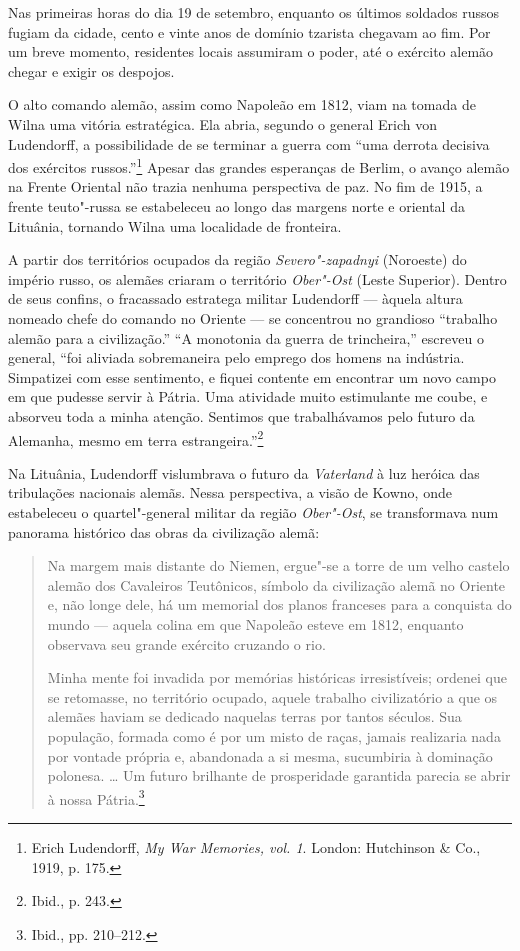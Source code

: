 Nas primeiras horas do dia 19 de setembro, enquanto os últimos soldados
russos fugiam da cidade, cento e vinte anos de domínio tzarista chegavam
ao fim. Por um breve momento, residentes locais assumiram o poder, até o
exército alemão chegar e exigir os despojos.

O alto comando alemão, assim como Napoleão em 1812, viam na tomada de
Wilna uma vitória estratégica. Ela abria, segundo o general Erich von
Ludendorff, a possibilidade de se terminar a guerra com ``uma derrota
decisiva dos exércitos russos.''\footnote{Erich Ludendorff, \emph{My War
  Memories, vol. 1}. London: Hutchinson \& Co., 1919, p. 175.} Apesar
das grandes esperanças de Berlim, o avanço alemão na Frente Oriental não
trazia nenhuma perspectiva de paz. No fim de 1915, a frente teuto"-russa
se estabeleceu ao longo das margens norte e oriental da Lituânia,
tornando Wilna uma localidade de fronteira.

A partir dos territórios ocupados da região \emph{Severo"-zapadnyi}
(Noroeste) do império russo, os alemães criaram o território
\emph{Ober"-Ost} (Leste Superior). Dentro de seus confins, o fracassado
estratega militar Ludendorff --- àquela altura nomeado chefe do comando no
Oriente --- se concentrou no grandioso ``trabalho alemão para a
civilização.'' ``A monotonia da guerra de trincheira,'' escreveu o
general, ``foi aliviada sobremaneira pelo emprego dos homens na
indústria. Simpatizei com esse sentimento, e fiquei contente em
encontrar um novo campo em que pudesse servir à Pátria. Uma atividade
muito estimulante me coube, e absorveu toda a minha atenção. Sentimos
que trabalhávamos pelo futuro da Alemanha, mesmo em terra
estrangeira.''\footnote{Ibid., p. 243.}

Na Lituânia, Ludendorff vislumbrava o futuro da \emph{Vaterland} à luz
heróica das tribulações nacionais alemãs. Nessa perspectiva, a visão de
Kowno, onde estabeleceu o quartel"-general militar da região
\emph{Ober"-Ost}, se transformava num panorama histórico das obras da
civilização alemã:

\begin{quote}
Na margem mais distante do Niemen, ergue"-se a torre de um velho castelo
alemão dos Cavaleiros Teutônicos, símbolo da civilização alemã no
Oriente e, não longe dele, há um memorial dos planos franceses para a
conquista do mundo --- aquela colina em que Napoleão esteve em 1812,
enquanto observava seu grande exército cruzando o rio.

Minha mente foi invadida por memórias históricas irresistíveis; ordenei
que se retomasse, no território ocupado, aquele trabalho civilizatório a
que os alemães haviam se dedicado naquelas terras por tantos séculos.
Sua população, formada como é por um misto de raças, jamais realizaria
nada por vontade própria e, abandonada a si mesma, sucumbiria à
dominação polonesa. \ldots{} Um futuro brilhante de prosperidade
garantida parecia se abrir à nossa Pátria.\footnote{Ibid., pp. 210--212.}
\end{quote}

